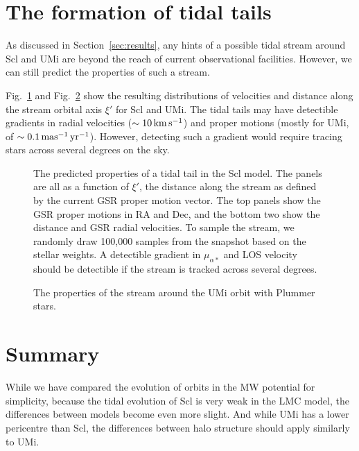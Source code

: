 \section{The formation of tidal
tails}\label{the-formation-of-tidal-tails}

As discussed in Section~\ref{sec:results}, any hints of a possible tidal
stream around Scl and UMi are beyond the reach of current observational
facilities. However, we can still predict the properties of such a
stream.

Fig.~\ref{fig:scl_tidal_stream} and Fig.~\ref{fig:umi_tidal_stream} show
the resulting distributions of velocities and distance along the stream
orbital axis \(\xi'\) for Scl and UMi. The tidal tails may have
detectible gradients in radial velocities (\(\sim 10\,{\rm km\,s^{-1}}\)) and proper
motions (mostly for UMi, of \(\sim 0.1\,{\rm mas^{-1}\,yr^{-1}}\)). However, detecting
such a gradient would require tracing stars across several degrees on
the sky.

\begin{figure}
\centering
{}
\caption[Sculptor predicted stream]{The predicted properties of a tidal
tail in the Scl model. The panels are all as a function of \(\xi'\), the
distance along the stream as defined by the current GSR proper motion
vector. The top panels show the GSR proper motions in RA and Dec, and
the bottom two show the distance and GSR radial velocities. To sample
the stream, we randomly draw 100,000 samples from the snapshot based on
the stellar weights. A detectible gradient in \(\mu_{\alpha*}\) and LOS
velocity should be detectible if the stream is tracked across several
degrees.}\label{fig:scl_tidal_stream}
\end{figure}

\begin{figure}
\centering
{}
\caption[Ursa Minor predicted stream]{The properties of the stream
around the UMi \smallperi{} orbit with Plummer
stars.}\label{fig:umi_tidal_stream}
\end{figure}

\section{Summary}\label{summary}

While we have compared the evolution of orbits in the MW potential for
simplicity, because the tidal evolution of Scl is very weak in the LMC
model, the differences between models become even more slight. And while
UMi has a lower pericentre than Scl, the differences between halo
structure should apply similarly to UMi.
